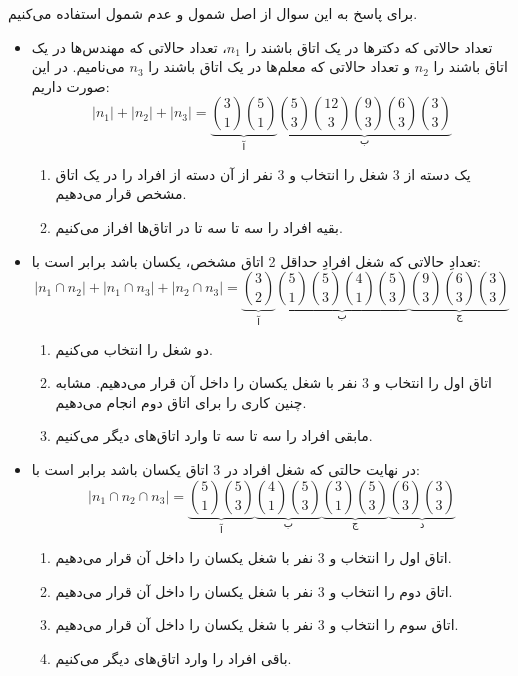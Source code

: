\p
برای پاسخ به این سوال از اصل شمول و عدم شمول استفاده می‌کنیم.
\begin{itemize}
    \item 
    تعداد حالاتی که دکترها در یک اتاق باشند را
    $n_1$،
    تعداد حالاتی که مهندس‌ها
     در یک اتاق باشند را
     $n_2$
    و تعداد حالاتی که معلم‌ها در یک اتاق باشند را
    $n_3$
    می‌نامیم.
    در این صورت داریم:
    $$|n_1| + |n_2| + |n_3| = \underbrace{\binom{3}{1}\binom{5}{1}}_{\text{آ}} \underbrace{\binom{5}{3}\binom{12}{3}\binom{9}{3}\binom{6}{3}\binom{3}{3}}_{\text{ب}}$$
    \begin{enumerate}
        \item  
         یک دسته از 3 شغل را انتخاب و 3 نفر از آن دسته از افراد را در یک اتاق مشخص قرار می‌دهیم.
        \item  
          بقیه افراد را سه تا سه تا در اتاق‌ها افراز می‌کنیم.
    \end{enumerate}

    \item 
   تعدادِ حالاتی که شغل افرادِ حداقل 2 اتاق مشخص، یکسان باشد برابر است با: 
   $$|n_1 \cap n_2| + |n_1 \cap n_3| + |n_2 \cap n_3| = \underbrace{\binom{3}{2}}_{\text{آ}}\underbrace{\binom{5}{1}\binom{5}{3}\binom{4}{1}\binom{5}{3}}_{\text{ب}}\underbrace{\binom{9}{3}\binom{6}{3}\binom{3}{3}}_{\text{ج}}$$
   \begin{enumerate}
       \item
       دو شغل را انتخاب می‌کنیم. 
       \item
       اتاق اول را انتخاب و 3 نفر با شغل یکسان را داخل آن قرار می‌دهیم. مشابه چنین کاری را برای اتاق دوم انجام می‌دهیم.
       \item 
       مابقی افراد را سه تا سه تا وارد اتاق‌های دیگر می‌کنیم.
\end{enumerate}

    
        \item 
        در نهایت حالتی که شغل افراد در 3 اتاق یکسان باشد 
        برابر است با:
        $$|n_1 \cap n_2 \cap n_3| = \underbrace{\binom{5}{1}\binom{5}{3}}_{\text{آ}}\underbrace{\binom{4}{1}\binom{5}{3}}_{\text{ب}}\underbrace{\binom{3}{1}\binom{5}{3}}_{\text{ج}}\underbrace{\binom{6}{3}\binom{3}{3}}_{\text{د}}$$
        \begin{enumerate}
        \item 
          اتاق اول را انتخاب و 3 نفر با شغل یکسان را داخل آن قرار می‌دهیم.
          \item
          اتاق دوم را انتخاب و 3 نفر با شغل یکسان را داخل آن قرار می‌دهیم.
          \item
          اتاق سوم را انتخاب و 3 نفر با شغل یکسان را داخل آن قرار می‌دهیم.
          \item
          باقی افراد را وارد اتاق‌های دیگر می‌کنیم.
    \end{enumerate}
\end{itemize} 

